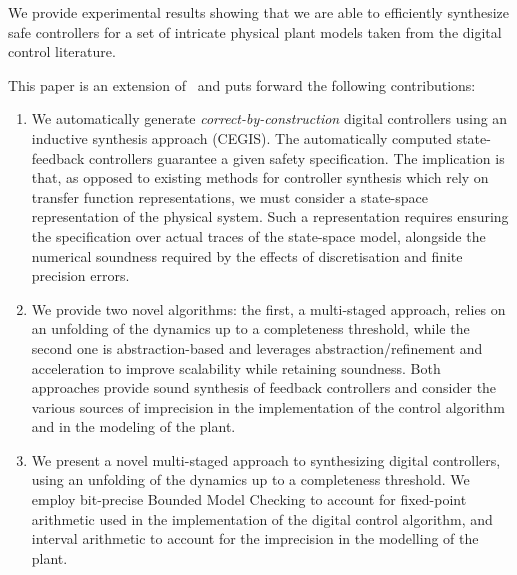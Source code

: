 We provide experimental results showing that we are able to
efficiently synthesize safe controllers for a set of intricate physical
plant models taken from the digital control literature.

This paper is an extension of~\cite{DBLP:conf/cav/AbateBCCDKKP17}
and puts forward the following contributions: 
%
\begin{enumerate}

\item We automatically generate \emph{correct-by-construction} digital
  controllers using an inductive synthesis approach (CEGIS).  
  The automatically computed state-feedback
  controllers guarantee a given safety specification.
  The implication is that, as opposed to existing
  methods for controller synthesis which rely on transfer function
  representations, we must consider a state-space representation of
  the physical system. Such a representation requires ensuring the
  specification over actual traces of the state-space model, alongside the
  numerical soundness required by the effects of discretisation and
  finite precision errors.

  
\ifx\axelerator
\item We provide two novel algorithms: the first, a multi-staged approach, relies on 
  an unfolding of the dynamics up to a completeness threshold, while the
  second one is abstraction-based and leverages abstraction/refinement and
  acceleration to improve scalability while retaining soundness.  %
  Both approaches provide sound synthesis of 
  feedback controllers and consider the various sources of imprecision in
  the implementation of the control algorithm and in the modeling of the
  plant. 
\else  
\item We present a novel multi-staged approach to synthesizing digital controllers, using 
  an unfolding of the dynamics up to a completeness threshold. 
  We employ bit-precise Bounded Model Checking to account for fixed-point arithmetic used in the implementation of the digital control algorithm, 
  and interval arithmetic to account for the imprecision in the modelling of the plant. 
  \fi
  

\end{enumerate}
